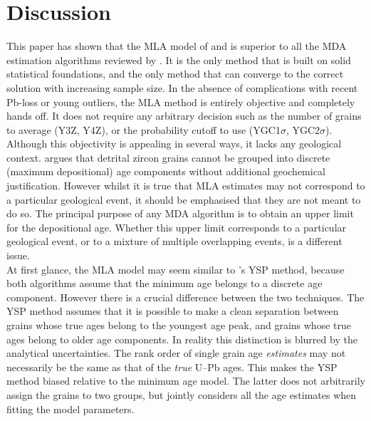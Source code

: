 \documentclass{article}
\begin{document}
\section{Discussion}
\label{sec:discussion}

This paper has shown that the MLA model of \citet{galbraith1993} and
\citet{galbraith2005} is superior to all the MDA estimation algorithms
reviewed by \citet{coutts2019}. It is the only method that is built on
solid statistical foundations, and the only method that can converge
to the correct solution with increasing sample size. In the absence of
complications with recent Pb-loss or young outliers, the MLA method is
entirely objective and completely hands off. It does not require any
arbitrary decision such as the number of grains to average (Y3Z, Y4Z),
or the probability cutoff to use (YGC1$\sigma$, YGC2$\sigma$).\\

Although this objectivity is appealing in several ways, it lacks any
geological context. \citet{copeland2020} argues that detrital zircon
grains cannot be grouped into discrete (maximum depositional) age
components without additional geochemical justification. However
whilst it is true that MLA estimates may not correspond to a
particular geological event, it should be emphasised that they are not
meant to do so.  The principal purpose of any MDA algorithm is to
obtain an upper limit for the depositional age. Whether this upper
limit corresponds to a particular geological event, or to a mixture of
multiple overlapping events, is a different issue.\\

At first glance, the MLA model may seem similar to
\citet{coutts2019}'s YSP method, because both algorithms assume that
the minimum age belongs to a discrete age component. However there is
a crucial difference between the two techniques. The YSP method
assumes that it is possible to make a clean separation between grains
whose true ages belong to the youngest age peak, and grains whose true
ages belong to older age components.  In reality this distinction is
blurred by the analytical uncertainties. The rank order of single
grain age \emph{estimates} may not necessarily be the same as that of
the \emph{true} U--Pb ages. This makes the YSP method biased relative
to the minimum age model.  The latter does not arbitrarily assign the
grains to two groups, but jointly considers all the age estimates when
fitting the model parameters.\\
\end{document}
